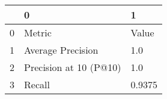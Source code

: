 \begin{tabular}{lll}
\toprule
{} &                       0 &       1 \\
\midrule
0 &                  Metric &   Value \\
1 &       Average Precision &     1.0 \\
2 &  Precision at 10 (P@10) &     1.0 \\
3 &                  Recall &  0.9375 \\
\bottomrule
\end{tabular}
